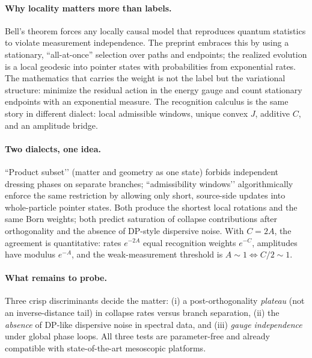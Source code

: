 \documentclass[11pt,letterpaper]{article}
\theoremstyle{definition}
\begin{document}
\paragraph{Why locality matters more than labels.}
Bell’s theorem forces any locally causal model that reproduces quantum statistics to violate measurement independence. The preprint embraces this by using a stationary, ``all-at-once'' selection over paths and endpoints; the realized evolution is a local geodesic into pointer states with probabilities from exponential rates. The mathematics that carries the weight is not the label but the variational structure: minimize the residual action in the energy gauge and count stationary endpoints with an exponential measure. The recognition calculus is the same story in different dialect: local admissible windows, unique convex \(J\), additive \(C\), and an amplitude bridge.
\paragraph{Two dialects, one idea.}
“Product subset’’ (matter and geometry as one state) forbids independent dressing phases on separate branches; “admissibility windows’’ algorithmically enforce the same restriction by allowing only short, source-side updates into whole-particle pointer states. Both produce the shortest local rotations and the same Born weights; both predict saturation of collapse contributions after orthogonality and the absence of DP-style dispersive noise. With \(C=2A\), the agreement is quantitative: rates \(e^{-2A}\) equal recognition weights \(e^{-C}\), amplitudes have modulus \(e^{-A}\), and the weak-measurement threshold is \(A\sim 1\Leftrightarrow C/2\sim 1\).
\paragraph{What remains to probe.}
Three crisp discriminants decide the matter: (i) a post-orthogonality \emph{plateau} (not an inverse-distance tail) in collapse rates versus branch separation, (ii) the \emph{absence} of DP-like dispersive noise in spectral data, and (iii) \emph{gauge independence} under global phase loops. All three tests are parameter-free and already compatible with state-of-the-art mesoscopic platforms.
\end{document}
